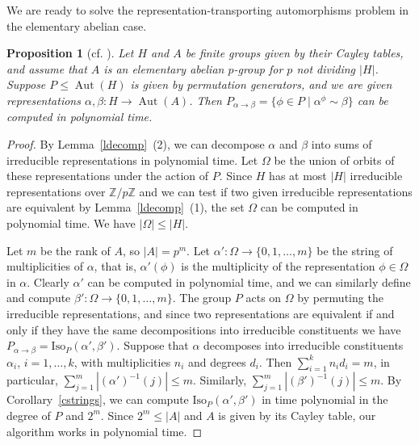 \documentclass{article}
\newtheorem{proposition}[theorem]{Proposition}
\DeclareMathOperator{\Aut}{Aut}
\begin{document}
We are ready to solve the representation-transporting automorphisms problem in the elementary abelian case.

\begin{proposition}[cf. {\cite[Theorem~5.3]{absyl}}]\label{elabcase}
	Let \( H \) and \( A \) be finite groups given by their Cayley tables, and assume that \( A \)
	is an elementary abelian \( p \)-group for \( p \) not dividing \( |H| \).
	Suppose \( P \leq \Aut(H) \) is given by permutation generators, and we are given representations \( \alpha, \beta : H \to \Aut(A) \).
	Then \( P_{\alpha \to \beta} = \{ \phi \in P \mid \alpha^\phi \sim \beta \} \) can be computed in polynomial time.
\end{proposition}
\begin{proof}
	By Lemma~\ref{ldecomp}~(2), we can decompose \( \alpha \) and \( \beta \) into sums of irreducible representations in polynomial time.
	Let \( \Omega \) be the union of orbits of these representations under the action of \( P \).
	Since \( H \) has at most \( |H| \) irreducible representations over \( \mathbb{Z}/p\mathbb{Z} \) and we can
	test if two given irreducible representations are equivalent by Lemma~\ref{ldecomp}~(1), the set \( \Omega \)
	can be computed in polynomial time. We have \( |\Omega| \leq |H| \).

	Let \( m \) be the rank of \( A \), so \( |A| = p^m \).
	Let \( \alpha' : \Omega \to \{ 0, 1, \dots, m \} \) be the string of multiplicities of \( \alpha \),
	that is, \( \alpha'(\phi) \) is the multiplicity of the representation \( \phi \in \Omega \) in \( \alpha \).
	Clearly \( \alpha' \) can be computed in polynomial time,
	and we can similarly define and compute \( \beta' : \Omega \to \{ 0, 1, \dots, m \} \). The group \( P \) acts on \( \Omega \)
	by permuting the irreducible representations, and since two representations are equivalent
	if and only if they have the same decompositions into irreducible constituents we have
	\( P_{\alpha \to \beta} = \mathrm{Iso}_P(\alpha', \beta') \).
	Suppose that \( \alpha \) decomposes into irreducible constituents \( \alpha_i \), \( i = 1, \dots, k \),
	with multiplicities \( n_i \) and degrees \( d_i \).
	Then \( \sum_{i = 1}^k n_i d_i = m \), in particular, \( \sum_{j=1}^m |(\alpha')^{-1}(j)| \leq m \).
	Similarly, \( \sum_{j=1}^m |(\beta')^{-1}(j)| \leq m \). By Corollary~\ref{cstrings}, we can compute
	\( \mathrm{Iso}_P(\alpha', \beta') \) in time polynomial in the degree of \( P \) and \( 2^m \).
	Since \( 2^m \leq |A| \) and \( A \) is given by its Cayley table, our algorithm works in polynomial time.
\end{proof}
\end{document}
